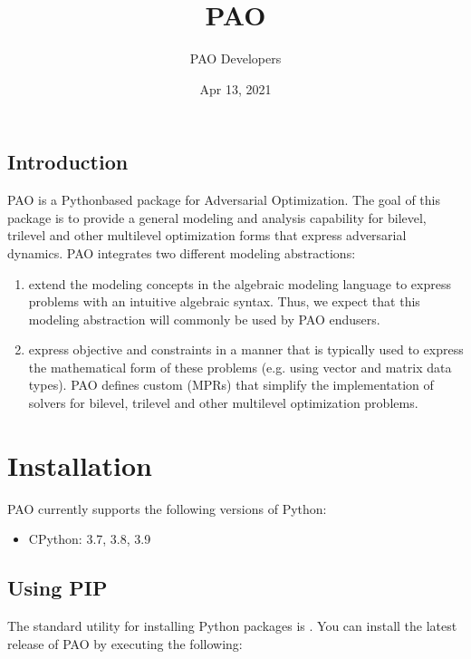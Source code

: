 \documentclass[letterpaper,10pt,english]{sphinxmanual}
\title{PAO}
\date{Apr 13, 2021}
\author{PAO Developers}
\begin{document}
\pagestyle{empty}
\sphinxmaketitle
\pagestyle{plain}
\sphinxtableofcontents
\pagestyle{normal}
\label{\detokenize{index::doc}}


\subsection{Introduction}

PAO is a Python\sphinxhyphen{}based package for Adversarial Optimization.  The goal of
this package is to provide a general modeling and analysis capability for
bilevel, trilevel and other multilevel optimization forms that express
adversarial dynamics.  PAO integrates two different modeling abstractions:
\begin{enumerate}
%
\item {} 
 extend the modeling concepts in the
 algebraic modeling language
to express problems with an intuitive algebraic syntax.  Thus, we
expect that this modeling abstraction will commonly be used by PAO
end\sphinxhyphen{}users.

\item {} 
 express objective and constraints in a manner
that is typically used to express the mathematical form of these
problems (e.g. using vector and matrix data types).  PAO defines
custom  (MPRs) that simplify the
implementation of solvers for bilevel, trilevel and other multilevel
optimization problems.

\end{enumerate}

\fi

\section{Installation}
\label{\detokenize{installation:installation}}\label{\detokenize{installation::doc}}
PAO currently supports the following versions of Python:
\begin{itemize}
\item {} 
CPython: 3.7, 3.8, 3.9

\end{itemize}


\subsection{Using PIP}
\label{\detokenize{installation:using-pip}}
The standard utility for installing Python packages is .
You can install the latest release of PAO by executing the following:
\end{document}
